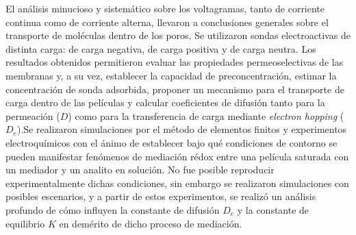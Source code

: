  El análisis minucioso y sistemático sobre los voltagramas, tanto de corriente continua como de corriente alterna, llevaron a conclusiones generales sobre el transporte de moléculas dentro de los poros. Se utilizaron sondas electroactivas de distinta carga: \ferroferri\space de carga negativa, \aminorutenio\space de carga positiva y \ferroceno\space de carga neutra. Los resultados obtenidos permitieron evaluar las propiedades permeoselectivas de las membranas y, a su vez, establecer la capacidad de preconcentración, estimar la concentración de sonda adsorbida, proponer un mecanismo para el transporte de carga dentro de las películas y calcular coeficientes de difusión tanto para la permeación ($D$) como para la transferencia de carga mediante \textit{electron hopping} ($D_e$).Se realizaron simulaciones por el método de elementos finitos y experimentos electroquímicos con el ánimo de establecer bajo qué condiciones de contorno se pueden manifestar fenómenos de mediación rédox entre una película saturada con un mediador y un analito en solución. No fue posible reproducir experimentalmente dichas condiciones, sin embargo se realizaron simulaciones con posibles escenarios, y a partir de estos experimentos, se realizó un análisis profundo de cómo influyen la constante de difusión $D_e$ y la constante de equilibrio $K$ en demérito de dicho proceso de mediación. 


